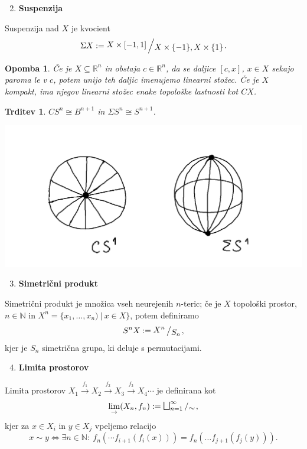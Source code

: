 \documentclass[10pt, a4paper]{article}
\newtheorem{trditev}[izr]{Trditev}
\newtheorem*{opomba}{Opomba}
\newcommand{\N}{\mathbb {N}}
\newcommand{\R}{\mathbb {R}}
\newcommand{\quot}[2]{{\raisebox{0.1em}{$#1$}\left/\raisebox{-0.2em}{$#2$}\right.}}
\begin{document}
\begin{enumerate}
  \setcounter{enumi}{1}
  \item \textbf{Suspenzija} 
\end{enumerate}

Suspenzija nad $X$ je kvocient 
  $$\Sigma X := \quot{X \times [-1, 1]}{X \times \{-1\}, X\times \{1\}}.$$

\begin{opomba}
  Če je $X \subseteq \R^n$ in obstaja $c \in \R^n$,
  da se daljice $[c, x]$, $x \in X$ sekajo paroma le v $c$,
  potem unijo teh daljic imenujemo linearni stožec.
  Če je $X$ kompakt, ima njegov linearni stožec enake 
  topološke lastnosti kot $CX$.
\end{opomba}

\begin{trditev}
  $CS^n \cong B^{n + 1}$ in $\Sigma S^n \cong S^{n + 1}$.
  \begin{center}
    \includegraphics[scale=0.4]{trditev1.png}
  \end{center}
\end{trditev}

\begin{enumerate}
  \setcounter{enumi}{2}
  \item \textbf{Simetrični produkt} 
\end{enumerate}

  Simetrični produkt je množica vseh neurejenih $n$-teric;
  če je $X$ topološki prostor, $n \in \N$ in $X^n = \{x_1, \dots, x_n)\ |\ x \in X\}$,
  potem definiramo 
  $$S^n X := \quot{X^n}{S_n},$$
  kjer je $S_n$ simetrična grupa, ki deluje s permutacijami.

\begin{enumerate}
  \setcounter{enumi}{3}
  \item \textbf{Limita prostorov} 
\end{enumerate}

  Limita prostorov $X_1 \stackrel{f_1}{\to} X_2 \stackrel{f_2}{\to} X_3 \stackrel{f_3}{\to} X_4 \cdots$
  je definirana kot $$\lim_{\rightarrow} (X_n, f_n) := \quot{\bigsqcup_{n = 1}^\infty}{\sim},$$
  kjer za $x \in X_i$ in $y \in X_j$ vpeljemo relacijo 
  $$x \sim y \Leftrightarrow \exists n \in \N:\ f_n (\cdots f_{i + 1} (f_i (x))) = f_n (\dots f_{j + 1} (f_j (y))).$$
\end{document}
